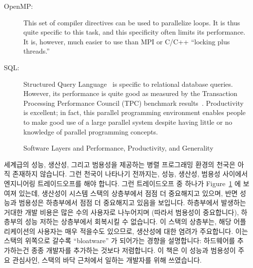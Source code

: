 \begin{description}
\item[OpenMP:] This set of compiler directives can be used
	to parallelize loops.  It is thus quite specific to this
	task, and this specificity often limits its performance.
	It is, however, much easier to use than MPI or C/C++
	``locking plus threads.''
\item[SQL:] Structured Query Language~\cite{DIS9075SQL92} is
	specific to relational database queries.
	However, its performance is quite good as measured by the
	Transaction Processing Performance Council (TPC)
	benchmark results~\cite{TPC}.
	Productivity is excellent; in fact, this parallel programming
	environment enables people to make good use of a large parallel
	system despite having little or no knowledge of parallel
	programming concepts.

\fi

\end{description}

\begin{figure}[tb]
\centering
{}
\caption{Software Layers and Performance, Productivity, and Generality}
\label{fig:intro:Software Layers and Performance, Productivity, and Generality}
\end{figure}

세계급의 성능, 생산성, 그리고 범용성을 제공하는 병렬 프로그래밍 환경의 천국은
아직 존재하지 않습니다.
그런 천국이 나타나기 전까지는, 성능, 생산성, 범용성 사이에서 엔지니어링
트레이드오프를 해야 합니다.
그런 트레이드오프 중 하나가
Figure~\ref{fig:intro:Software Layers and Performance, Productivity, and Generality}
에 보여져 있는데, 생산성이 시스템 스택의 상층부에서 점점 더 중요해지고 있으며,
반면 성능과 범용성은 하층부에서 점점 더 중요해지고 있음을 보입니다.
하층부에서 발생하는 거대한 개발 비용은 많은 수의 사용자로 나누어지며 (따라서
범용성이 중요합니다), 하층부의 성능 저하는 상층부에서 회복시킬 수 없습니다.
이 스택의 상층부는, 해당 어플리케이션의 사용자는 매우 적을수도 있으므로,
생산성에 대한 염려가 주요합니다.
이는 스택의 위쪽으로 갈수록 ``bloatware'' 가 되어가는 경향을 설명합니다:
하드웨어를 추가하는건 종종 개발자를 추가하는 것보다 저렴합니다.
이 책은 이 성능과 범용성이 주요 관심사인, 스택의 바닥 근처에서 일하는 개발자를
위해 쓰였습니다.

